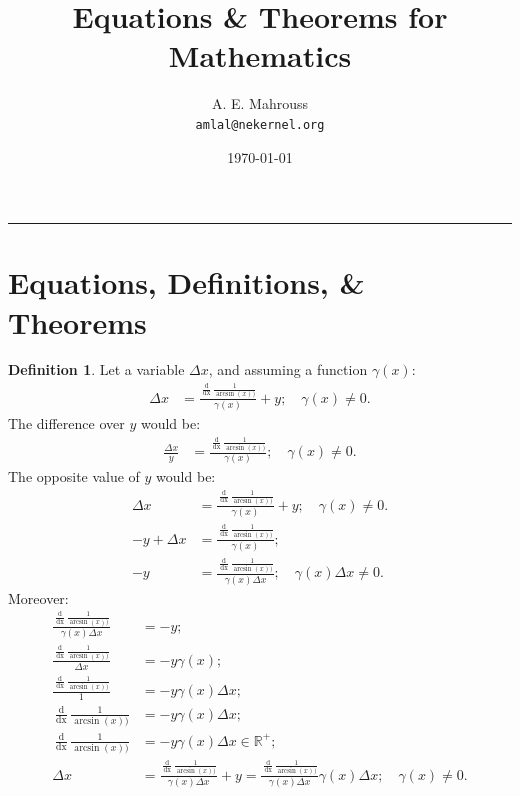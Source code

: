 \documentclass[10pt]{article}
\title{%
  \vspace{-1.5em}%
  \large\textbf{Equations \& Theorems for Mathematics}%
}
\author{A. E. Mahrouss\\\texttt{amlal@nekernel.org}}
\date{\today}
\theoremstyle{plain}
\theoremstyle{definition}
\newtheorem{definition}[theorem]{Definition}
\theoremstyle{remark}
\begin{document}
  \maketitle
\vspace{-0.5em}
\vspace{0.8em}
\rule{\linewidth}{0.4pt}
\vspace{1em}
\section{Equations, Definitions, \& Theorems}

\begin{definition}
	Let a variable $\Delta x$, and assuming a function $\gamma(x)$:
	\begin{align*}
	\Delta x &=	\frac{\frac{\operatorname{d}}{\operatorname{dx}}\frac{1}{\arcsin(x))}}{\gamma(x)} + y; \quad \gamma(x) \neq 0.
	\end{align*}
	The difference over $y$ would be:
	\begin{align*}
		\frac{\Delta x}{y} &= \frac{\frac{\operatorname{d}}{\operatorname{dx}}\frac{1}{\arcsin(x))}}{\gamma(x)}; \quad \gamma(x) \neq 0.
	\end{align*}
	The opposite value of $y$ would be:
	\begin{align*}
		\Delta x &=	\frac{\frac{\operatorname{d}}{\operatorname{dx}}\frac{1}{\arcsin(x))}}{\gamma(x)} + y; \quad \gamma(x) \neq 0.\\
		-y + \Delta x &=	\frac{\frac{\operatorname{d}}{\operatorname{dx}}\frac{1}{\arcsin(x))}}{\gamma(x)};\\
	- y &= \frac{\frac{\operatorname{d}}{\operatorname{dx}}\frac{1}{\arcsin(x))}}{\gamma(x) \Delta x}; \quad \gamma(x) \Delta x \neq 0.
	\end{align*}
	Moreover:
	\begin{align*}
		\frac{\frac{\operatorname{d}}{\operatorname{dx}}\frac{1}{\arcsin(x))}}{\gamma(x) \Delta x} &= -y;\\
		\frac{\frac{\operatorname{d}}{\operatorname{dx}}\frac{1}{\arcsin(x))}}{\Delta x} &= -y \gamma(x);\\
		\frac{\frac{\operatorname{d}}{\operatorname{dx}}\frac{1}{\arcsin(x))}}{1} &= -y \gamma(x)\Delta x;\\
		\frac{\operatorname{d}}{\operatorname{dx}}\frac{1}{\arcsin(x))} &= -y \gamma(x)\Delta x;\\
		\frac{\operatorname{d}}{\operatorname{dx}}\frac{1}{\arcsin(x))}&= -y \gamma(x)\Delta x \in \mathbb{R}^{+};\\
		\Delta x &= \frac{\frac{\operatorname{d}}{\operatorname{dx}}\frac{1}{\arcsin(x))}}{\gamma(x) \Delta x} +y = \frac{\frac{\operatorname{d}}{\operatorname{dx}}\frac{1}{\arcsin(x))}}{\gamma(x) \Delta x} \gamma(x)\Delta x; \quad \gamma(x) \neq 0.
	\end{align*}
\end{definition}

\nocite{*}



\end{document}
